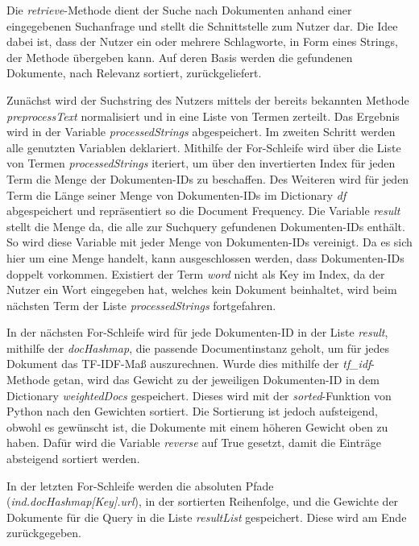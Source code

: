 Die \textit{retrieve}-Methode dient der Suche nach Dokumenten anhand einer eingegebenen Suchanfrage und stellt die Schnittstelle zum Nutzer dar. Die Idee dabei ist, dass der Nutzer ein oder mehrere Schlagworte, in Form eines Strings, der Methode übergeben kann. Auf deren Basis werden die gefundenen Dokumente, nach Relevanz sortiert, zurückgeliefert. 

Zunächst wird der Suchstring des Nutzers mittels der bereits bekannten Methode \textit{preprocessText} normalisiert und in eine Liste von Termen zerteilt. Das Ergebnis wird in der Variable \textit{processedStrings} abgespeichert. Im zweiten Schritt werden alle genutzten Variablen deklariert. Mithilfe der For-Schleife wird über die Liste von Termen \textit{processedStrings} iteriert, um über den invertierten Index für jeden Term die Menge der Dokumenten-IDs zu beschaffen. Des Weiteren wird für jeden Term die Länge seiner Menge von Dokumenten-IDs im Dictionary \textit{df} abgespeichert und repräsentiert so die Document Frequency. Die Variable \textit{result} stellt die Menge da, die alle zur Suchquery gefundenen Dokumenten-IDs enthält. So wird diese Variable mit jeder Menge von Dokumenten-IDs vereinigt. Da es sich hier um eine Menge handelt, kann ausgeschlossen werden, dass Dokumenten-IDs doppelt vorkommen. Existiert der Term \textit{word} nicht als Key im Index, da der Nutzer ein Wort eingegeben hat, welches kein Dokument beinhaltet, wird beim nächsten Term der Liste \emph{processedStrings} fortgefahren.

In der nächsten For-Schleife wird für jede Dokumenten-ID in der Liste \textit{result}, mithilfe der \textit{docHashmap}, die passende Documentinstanz geholt, um für jedes Dokument das TF-IDF-Maß auszurechnen. Wurde dies mithilfe der \textit{tf\_idf}-Methode getan, wird das Gewicht zu der jeweiligen Dokumenten-ID in dem Dictionary \textit{weightedDocs} gespeichert. Dieses wird mit der \textit{sorted}-Funktion von Python nach den Gewichten sortiert. Die Sortierung ist jedoch aufsteigend, obwohl es gewünscht  ist, die Dokumente mit einem höheren Gewicht oben zu haben. Dafür wird die Variable \textit{reverse} auf True gesetzt, damit die Einträge absteigend sortiert werden.

In der letzten For-Schleife werden die absoluten Pfade (\textit{ind.docHashmap[Key].url}), in der sortierten Reihenfolge, und die Gewichte der Dokumente für die Query in die Liste \textit{resultList} gespeichert. Diese wird am Ende zurückgegeben.

